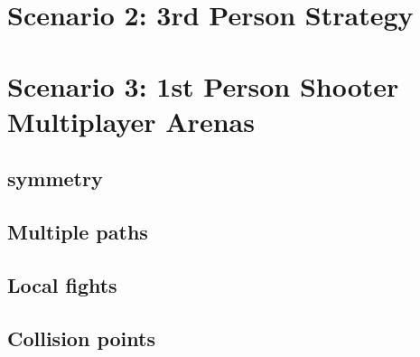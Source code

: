 

\section{Scenario 2: 3rd Person Strategy}


% 
%
%
%



% 
%
%
%
%


\section{Scenario 3: 1st Person Shooter Multiplayer Arenas}



\subsection{symmetry}

\subsection{Multiple paths}

\subsection{Local fights}

\subsection{Collision points}

